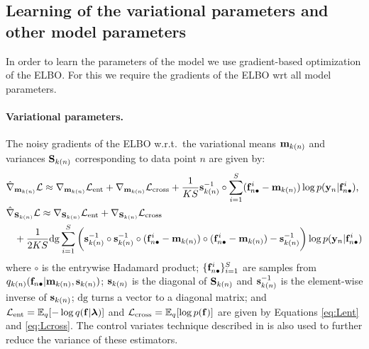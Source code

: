 \subsection{Learning of the variational parameters and other model parameters}
\newcommand{\mkn}{\m_{k(n)}}
\newcommand{\Skn}{\S_{k(n)}}
\newcommand{\skn}{\s_{k(n)}}
In order to learn the parameters of the model we use gradient-based optimization of the ELBO.
For this we require the gradients of the ELBO wrt all model parameters.
\paragraph{Variational parameters.}
The noisy gradients 
of the ELBO w.r.t.~the variational means $\mkn$ and variances $\Skn$ 
corresponding to  data point $n$ are given by:
\begin{align}
\hat \nabla&_{\mkn}  \calL \approx \nabla_{\mkn} \Lent 
+ \nabla_{\mkn} \Lcross 
+ \frac{1}{KS}  \skn^{-1} \circ \sum_{i=1}^S  (\fn^i - \mkn) \log p(\y_n | \fn^i) \text{,} \\
\nonumber
\hat \nabla&_{\Skn} \calL \approx \nabla_{\Skn} \Lent 
+ \nabla_{\Skn} \Lcross \\
&+ \frac{1}{2KS}  \mathrm{dg}  \sum_{i=1}^S \bigg(\skn^{-1} \circ \skn^{-1} \circ (\fn^i - \mkn) \circ (\fn^i - \mkn) - \skn^{-1} \bigg) \log p(\y_n | \fn^i) 
\end{align}
where $\circ$ is the entrywise Hadamard product;
 $\{\mathbf{f}_{n \bullet}^i\}_{i=1}^{S}$ are samples from $q_{k(n)} (\fn | \mkn, \skn)$; 
$\skn$ is the diagonal of $\Skn$ and $\skn^{-1}$ is the element-wise inverse of $\skn$; $\mathrm{dg}$ turns a vector to a diagonal matrix;  and
$\mathcal{L}_{\text{ent}} = \mathbb{E}_q [ - \log q(\mathbf{f} | \boldsymbol{\lambda})]$ 
and $\mathcal{L}_{\text{cross}} = \mathbb{E}_q  [\log p(\mathbf{f})]$ are given by Equations 
\eqref{eq:Lent} and 
\eqref{eq:Lcross}.
The control variates technique described in \cite{ranganath2014black} is also 
used to further reduce the variance of these estimators.
%
%
